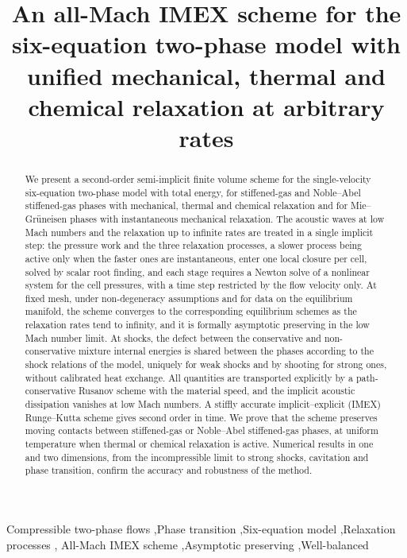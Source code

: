\documentclass[preprint,12pt]{elsarticle}
\begin{document}
\begin{frontmatter}
\title{An all-Mach IMEX scheme for the six-equation two-phase model with unified mechanical, thermal and chemical relaxation at arbitrary rates}
\begin{abstract}
We present a second-order semi-implicit finite volume scheme for the single-velocity six-equation two-phase model
with total energy, for stiffened-gas and Noble--Abel stiffened-gas phases with mechanical, thermal and chemical
relaxation and for Mie--Gr\"uneisen phases with instantaneous mechanical relaxation. The acoustic waves at low Mach
numbers and the relaxation up to infinite rates are treated in a single implicit step: the pressure work and the three
relaxation processes, a slower process being active only when the faster ones are instantaneous, enter one local
closure per cell, solved by scalar root finding, and each stage requires a Newton solve of a nonlinear system for the
cell pressures, with a time step restricted by the flow velocity only. At fixed mesh, under non-degeneracy
assumptions and for data on the equilibrium manifold, the scheme converges to the corresponding equilibrium schemes as the relaxation rates tend to infinity,
and it is formally asymptotic preserving in the low Mach number limit. At shocks, the defect between the conservative
and non-conservative mixture internal energies is shared between the phases according to the shock relations of the
model, uniquely for weak shocks and by shooting for strong ones, without calibrated heat exchange. All quantities are
transported explicitly by a path-conservative Rusanov scheme with the material speed, and the implicit acoustic
dissipation vanishes at low Mach numbers. A stiffly accurate implicit--explicit (IMEX) Runge--Kutta scheme gives
second order in time. We prove that the scheme preserves moving contacts between stiffened-gas or Noble--Abel
stiffened-gas phases, at uniform temperature when thermal or chemical relaxation is active. Numerical results in one
and two dimensions, from the incompressible limit to strong shocks, cavitation and phase transition, confirm the
accuracy and robustness of the method.
\end{abstract}
\begin{keyword}
Compressible two-phase flows \sep Phase transition \sep Six-equation model \sep Relaxation processes \sep
All-Mach IMEX scheme \sep Asymptotic preserving \sep Well-balanced
\end{keyword}
\end{frontmatter}









\end{document}
